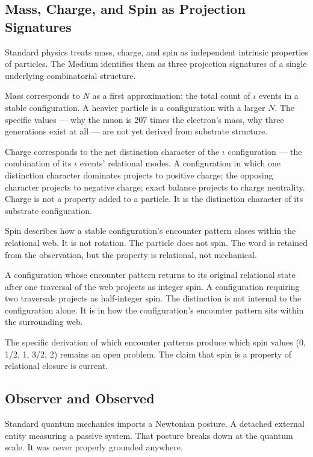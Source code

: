 \documentclass[11pt,letterpaper]{article}
\begin{document}
\subsection{Mass, Charge, and Spin as Projection Signatures}
\label{sec:orgf2df784}

Standard physics treats mass, charge, and spin as independent intrinsic properties of particles. The Medium identifies them as three projection signatures of a single underlying combinatorial structure.

Mass corresponds to \(N\) as a first approximation: the total count of \(\iota\) events in a stable configuration. A heavier particle is a configuration with a larger \(N\). The specific values --- why the muon is 207 times the electron's mass, why three generations exist at all --- are not yet derived from substrate structure.

Charge corresponds to the net distinction character of the \(\iota\) configuration --- the combination of its \(\iota\) events' relational modes. A configuration in which one distinction character dominates projects to positive charge; the opposing character projects to negative charge; exact balance projects to charge neutrality. Charge is not a property added to a particle. It is the distinction character of its substrate configuration.

Spin describes how a stable configuration's encounter pattern closes within the relational web. It is not rotation. The particle does not spin. The word is retained from the observation, but the property is relational, not mechanical.

A configuration whose encounter pattern returns to its original relational state after one traversal of the web projects as integer spin. A configuration requiring two traversals projects as half-integer spin. The distinction is not internal to the configuration alone. It is in how the configuration's encounter pattern sits within the surrounding web.

The specific derivation of which encounter patterns produce which spin values (0, 1/2, 1, 3/2, 2) remains an open problem. The claim that spin is a property of relational closure is current.

\subsection{Observer and Observed}
\label{sec:orgb215383}


Standard quantum mechanics imports a Newtonian posture. A detached external entity measuring a passive system. That posture breaks down at the quantum scale. It was never properly grounded anywhere.
\end{document}
